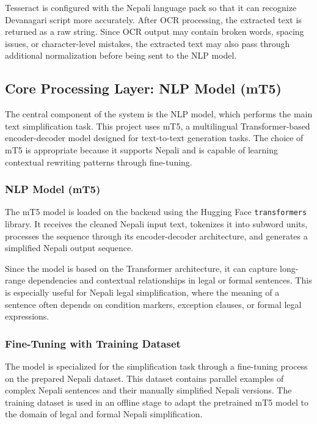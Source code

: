 \documentclass[12pt]{report}
\begin{document}
Tesseract is configured with the Nepali language pack so that it can recognize Devanagari script more accurately. After OCR processing, the extracted text is returned as a raw string. Since OCR output may contain broken words, spacing issues, or character-level mistakes, the extracted text may also pass through additional normalization before being sent to the NLP model.

\subsection{Core Processing Layer: NLP Model (mT5)}

The central component of the system is the NLP model, which performs the main text simplification task. This project uses mT5, a multilingual Transformer-based encoder-decoder model designed for text-to-text generation tasks. The choice of mT5 is appropriate because it supports Nepali and is capable of learning contextual rewriting patterns through fine-tuning.

\subsubsection{NLP Model (mT5)}

The mT5 model is loaded on the backend using the Hugging Face \texttt{transformers} library. It receives the cleaned Nepali input text, tokenizes it into subword units, processes the sequence through its encoder-decoder architecture, and generates a simplified Nepali output sequence.

Since the model is based on the Transformer architecture, it can capture long-range dependencies and contextual relationships in legal or formal sentences. This is especially useful for Nepali legal simplification, where the meaning of a sentence often depends on condition markers, exception clauses, or formal legal expressions.

\subsubsection{Fine-Tuning with Training Dataset}

The model is specialized for the simplification task through a fine-tuning process on the prepared Nepali dataset. This dataset contains parallel examples of complex Nepali sentences and their manually simplified Nepali versions. The training dataset is used in an offline stage to adapt the pretrained mT5 model to the domain of legal and formal Nepali simplification.
\end{document}
